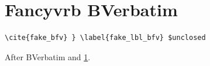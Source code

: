 \documentclass{article}
\begin{document}
\section{Fancyvrb BVerbatim}\label{sec:env_bfv}
\begin{BVerbatim}[baseline=t]
\cite{fake_bfv} } \label{fake_lbl_bfv} $unclosed
\end{BVerbatim}
After BVerbatim \cite{k1} and \ref{sec:env_bfv}.


\end{document}
